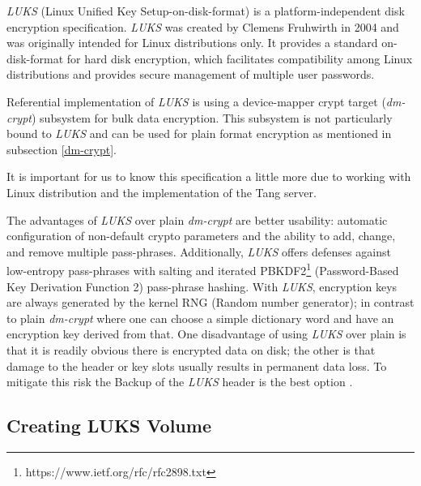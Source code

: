 {\it LUKS} (Linux Unified Key Setup-on-disk-format) is a platform-independent disk encryption specification.
{\it LUKS} was created by Clemens Fruhwirth in 2004 and was originally intended for Linux distributions only.
It provides a standard on-disk-format for hard disk encryption, which facilitates compatibility among Linux distributions and provides secure management of multiple user passwords.

Referential implementation of {\it LUKS} is using a device-mapper crypt target ({\it dm-crypt}) subsystem for bulk data encryption.
This subsystem is not particularly bound to {\it LUKS} and can be used for plain format encryption as mentioned in subsection \ref{dm-crypt}.

It is important for us to know this specification a little more due to working with Linux distribution and the implementation of the Tang server.

The advantages of {\it LUKS} over plain {\it dm-crypt} are better usability: automatic configuration of non-default crypto parameters and the ability to add, change, and remove multiple pass-phrases.
Additionally, {\it LUKS} offers defenses against low-entropy pass-phrases with salting and iterated PBKDF2\footnote{https://www.ietf.org/rfc/rfc2898.txt} (Password-Based Key Derivation Function 2) pass-phrase hashing\cite{RFC2898}.
With {\it LUKS}, encryption keys are always generated by the kernel RNG (Random number generator); in contrast to plain {\it dm-crypt} where one can choose a simple dictionary word and have an encryption key derived from that.
One disadvantage of using {\it LUKS} over plain is that it is readily obvious there is encrypted data on disk; the other is that damage to the header or key slots usually results in permanent data loss.
To mitigate this risk the Backup of the {\it LUKS} header is the best option \cite{fruhwirth2005luks}.



\subsection{Creating LUKS Volume}

